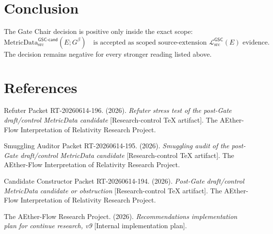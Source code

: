 \documentclass[11pt]{article}
\newcommand{\MetricDataCand}{\mathrm{MetricData}_{\mathrm{src}}^{\mathsf{GSC\mbox{-}cand}}}
\newcommand{\MetricData}{\mathcal{L}_{\mathrm{src}}^{\mathsf{GSC}}}
\newcommand{\Gbeta}{G^{\beta}}
\begin{document}
\section{Conclusion}

The Gate Chair decision is positive only inside the exact scope:
\[
\MetricDataCand(E;\Gbeta)
\quad\text{is accepted as scoped source-extension }\MetricData(E)\text{ evidence.}
\]
The decision remains negative for every stronger reading listed above.

\section{References}

Refuter Packet RT-20260614-196. (2026). \emph{Refuter stress test of the
post-Gate draft/control MetricData candidate} [Research-control TeX artifact].
The AEther-Flow Interpretation of Relativity Research Project.

Smuggling Auditor Packet RT-20260614-195. (2026). \emph{Smuggling audit of the
post-Gate draft/control MetricData candidate} [Research-control TeX artifact].
The AEther-Flow Interpretation of Relativity Research Project.

Candidate Constructor Packet RT-20260614-194. (2026). \emph{Post-Gate
draft/control MetricData candidate or obstruction} [Research-control TeX
artifact]. The AEther-Flow Interpretation of Relativity Research Project.

The AEther-Flow Research Project. (2026). \emph{Recommendations implementation
plan for continue research, v9} [Internal implementation plan].
\end{document}
